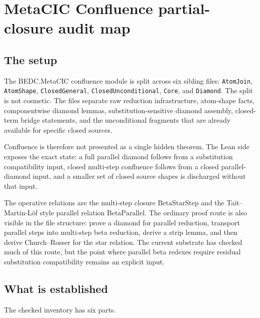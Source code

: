 \chapter{MetaCIC Confluence partial-closure audit map}
\label{ch:metacic-confluence-audit-map}

\section{The setup}
\label{sec:metacic-confluence-audit-map-setup}

The BEDC.MetaCIC confluence module is split across six sibling files:
\texttt{AtomJoin}, \texttt{AtomShape}, \texttt{ClosedGeneral},
\texttt{ClosedUnconditional}, \texttt{Core}, and \texttt{Diamond}. The split is
not cosmetic. The files separate raw reduction infrastructure, atom-shape
facts, componentwise diamond lemmas, substitution-sensitive diamond assembly,
closed-term bridge statements, and the unconditional fragments that are already
available for specific closed sources.

Confluence is therefore not presented as a single hidden theorem. The Lean side
exposes the exact state: a full parallel diamond follows from a substitution
compatibility input, closed multi-step confluence follows from a closed
parallel-diamond input, and a smaller set of closed source shapes is discharged
without that input.

The operative relations are the multi-step closure $\mathrm{BetaStarStep}$ and
the Tait--Martin-L\"of style parallel relation $\mathrm{BetaParallel}$. The
ordinary proof route is also visible in the file structure: prove a diamond for
parallel reduction, transport parallel steps into multi-step beta reduction,
derive a strip lemma, and then derive Church--Rosser for the star relation. The
current substrate has checked much of this route, but the point where parallel
beta redexes require residual substitution compatibility remains an explicit
input.

\section{What is established}
\label{sec:metacic-confluence-audit-map-established}

The checked inventory has six parts.

